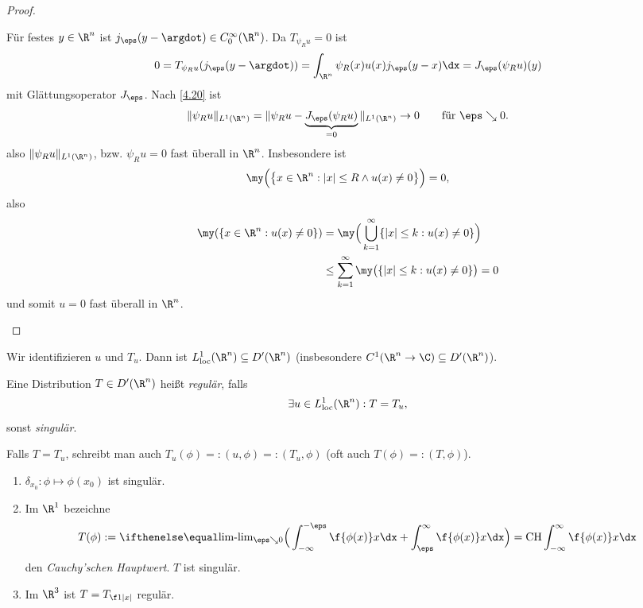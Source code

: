\begin{st}
\begin{proof}
\begin{enumerate}[1)]
\begin{enumerate}[a)]
						Für festes $y\in \R^n$ ist $j_\eps(y-\argdot) \in C_0^\infty(\R^n)$.
						Da $T_{\psi_R u} = 0$ ist
						\[
							0 = T_{\psi_R u} (j_\eps(y-\argdot))
							= \int_{\R^n} \psi_R(x) u(x) j_\eps(y-x) \dx
							= J_\eps(\psi_R u)(y)
						\]
						mit Glättungsoperator $J_\eps$.
						Nach \ref{4.20} ist
						\[
							\|\psi_R u \|_{L^1(\R^n)}
							= \|\psi_R u - \underbrace{J_\eps(\psi_R u)}_{=0} \|_{L^1(\R^n)}
							\to 0 \qquad \text{für $\eps \searrow 0$.}
						\]
						also $\|\psi_R u \|_{L^1(\R^n)}$, bzw. $\psi_R u = 0$ fast überall in $\R^n$.
						Insbesondere ist
						\[
							\my \Big(\big\{ x \in \R^n : |x| \le R \land u(x) \neq 0 \big\} \Big) = 0,
						\]
						also
						\begin{align*}
							\my(\{x\in \R^n : u(x) \neq 0\})
							&= \my \Big( \bigcup_{k=1}^\infty \{|x| \le k : u(x) \neq 0\} \Big) \\
							&\le \sum_{k=1}^\infty \my \big( \{|x|\le k : u(x)\neq 0\}\big)
							= 0
						\end{align*}
						und somit $u= 0$ fast überall in $\R^n$.
				\end{enumerate}
		\end{enumerate}
	\end{proof}
\end{st}

\begin{df} \label{5.8}
	Wir identifizieren $u$ und $T_u$.
	Dann ist $L_{\text{loc}}^1 (\R^n) \subset D'(\R^n)$ (insbesondere $C^1(\R^n \to \C) \subset D'(\R^n)$).

	Eine Distribution $T \in D'(\R^n)$ heißt \emph{regulär}, falls
	\[
		\exists u \in L_{\text{loc}}^1 (\R^n) : T = T_u,
	\]
	sonst \emph{singulär}.

	Falls $T = T_u$, schreibt man auch $T_u(\phi) =: (u,\phi) =: (T_u,\phi)$ (oft auch $T(\phi) =: (T,\phi)$).
\end{df}

\begin{ex} \label{5.9}
	\begin{enumerate}[1)]
		\item
			$\delta_{x_0} : \phi \mapsto \phi(x_0)$ ist singulär.
		\item
			Im $\R^1$ bezeichne
			\[
				T(\phi) := \lim_{\eps \searrow 0} \Big( \int_{-\infty}^{-\eps} \f{\phi(x)}x \dx + \int_{\eps}^\infty \f {\phi(x)}x \dx \Big)
				= \CH \int_{-\infty}^\infty \f {\phi(x)}x \dx
			\]
			den \emph{Cauchy'schen Hauptwert}.
			$T$ ist singulär.
		\item
			Im $\R^3$ ist $T = T_{\f 1{|x|}}$ regulär.
	\end{enumerate}
\end{ex}

